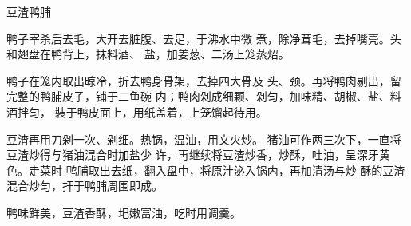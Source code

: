 \begin{recipe}{豆渣鸭脯}

\ingredients



\cooking

\step 	鸭子宰杀后去毛，大开去脏腹、去足，于沸水中微 煮，除净茸毛，去掉嘴壳。头和翅盘在鸭背上，抹料酒、 盐，加姜葱、二汤上笼蒸炤。

\step 	鸭子在笼内取出晾冷，折去鸭身骨架，去掉四大骨及 头、颈。再将鸭肉剔出，留完整的鸭脯皮子，铺于二鱼碗 内；鸭肉剁成细颗、剁匀，加味精、胡椒、盐、料酒拌匀， 裝于鸭皮面上，用纸盖着，上笼馏起待用。

\step 	豆渣再用刀剁一次、剁细。热锅，温油，用文火炒。 猪油可作两三次下，一直将豆渣炒得与猪油混合时加盐少 许，再继续将豆渣炒香，炒酥，吐油，呈深牙黄色。走菜时 鸭脯取出去纸，翻入盘中，将原汁泌入锅内，再加清汤与炒 酥的豆渣混合炒匀，扞于鸭脯周围即成。

\notes

鸭味鲜美，豆渣香酥，圯嫩富油，吃时用调羹。

\end{recipe}


